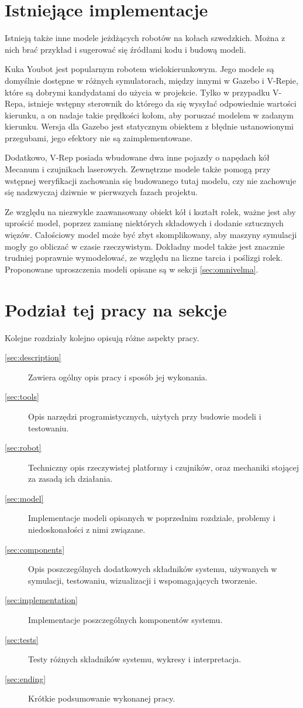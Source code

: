 \section{Istniejące implementacje}
	Istnieją także inne modele jeżdżących robotów na kołach szwedzkich.
	Można z nich brać przykład i sugerować się źródłami kodu i budową modeli.

	Kuka Youbot jest popularnym robotem wielokierunkowym. Jego modele są domyślnie dostępne w różnych symulatorach, między innymi w Gazebo i V-Repie, które są dobrymi kandydatami do 
	użycia w projekcie.
	Tylko w przypadku V-Repa, istnieje wstępny sterownik do którego da się wysyłać odpowiednie wartości kierunku, a on nadaje takie prędkości kołom, aby poruszać modelem w zadanym kierunku.
	Wersja dla Gazebo jest statycznym obiektem z błędnie ustanowionymi przegubami, jego efektory nie są zaimplementowane.
	
	Dodatkowo, V-Rep posiada wbudowane dwa inne pojazdy o napędach kół Mecanum i czujnikach laserowych.
	Zewnętrzne modele także pomogą przy wstępnej weryfikacji zachowania się budowanego tutaj modelu, czy nie zachowuje się nadzwyczaj dziwnie w pierwszych fazach projektu.

	Ze względu na niezwykle zaawansowany obiekt kół i kształt rolek, ważne jest aby uprościć model, poprzez zamianę niektórych składowych i dodanie sztucznych więzów.
	Całościowy model może być zbyt skomplikowany, aby maszyny symulacji mogły go obliczać w czasie rzeczywistym.
	Dokładny model także jest znacznie trudniej poprawnie wymodelować, ze względu na liczne tarcia i poślizgi rolek.
	Proponowane uproszczenia modeli opisane są w sekcji \ref{sec:omnivelma}.
	
\section{Podział tej pracy na sekcje}
	Kolejne rozdziały kolejno opisują różne aspekty pracy.
	\begin{description}
		\item[\ref{sec:description}] Zawiera ogólny opis pracy i sposób jej wykonania.
		\item[\ref{sec:tools}] Opis narzędzi programistycznych, użytych przy budowie modeli i testowaniu.
		\item[\ref{sec:robot}] Techniczny opis rzeczywistej platformy i czujników, oraz mechaniki stojącej za zasadą ich działania.
		\item[\ref{sec:model}] Implementacje modeli opisanych w poprzednim rozdziale, problemy i niedoskonałości z nimi związane.
		\item[\ref{sec:components}] Opis poszczególnych dodatkowych składników systemu, używanych w symulacji, testowaniu, wizualizacji i wspomagających tworzenie.
		\item[\ref{sec:implementation}] Implementacje poszczególnych komponentów systemu.
		\item[\ref{sec:tests}] Testy różnych składników systemu, wykresy i interpretacja.
		\item[\ref{sec:ending}] Krótkie podsumowanie wykonanej pracy.
	\end{description}
